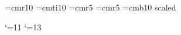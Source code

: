 

\loadeufm

\font\dotless=cmr10 %
\font\itdotless=cmti10
\def\itumi{{\"{\itdotless\char'020}}}
\def\itumj{{\"{\itdotless\char'021}}}
\def\umi{{\"{\dotless\char'020}}}
\def\umj{{\"{\dotless\char'021}}}
\font\thinlinefont=cmr5
\font\smaller=cmr5
\font\boldtitlefont=cmb10 scaled

\NoRunningHeads
{}
\loadeusm

\catcode`\@=11
\def\logo@{}
\catcode`\@=13

\def\eps{{\varepsilon}}
\def\WC{{W_{\dbC}}}
\def\XC{{X_{\dbC}}}
\def\YC{{Y_{\dbC}}}

\def\undertext#1{$\underline{\vphantom{y}\hbox{#1}}$}
\def\nspace{\lineskip=1pt\baselineskip=12pt%
     \lineskiplimit=0pt}
\def\dspace{\lineskip=2pt\baselineskip=18pt%
     \lineskiplimit=0pt}

\def\w{{\mathchoice{\,{\scriptstyle\wedge}\,}
  {{\scriptstyle\wedge}}
  {{\scriptscriptstyle\wedge}}{{\scriptscriptstyle\wedge}}}}
\def\Le{{\mathchoice{\,{\scriptstyle\le}\,}
{\,{\scriptstyle\le}\,}
{\,{\scriptscriptstyle\le}\,}{\,{\scriptscriptstyle\le}\,}}}
\def\Ge{{\mathchoice{\,{\scriptstyle\ge}\,}
{\,{\scriptstyle\ge}\,}
{\,{\scriptscriptstyle\ge}\,}{\,{\scriptscriptstyle\ge}\,}}}

\def\red{\text{\rm red}}
\def\Ber{\text{\rm Ber}}
\def\Diff{\text{\rm Diff}}
\def\HOM{\underline{\text{\rm Hom}}}
\def\Hom{\text{\rm Hom}}

\def\fbar{\bar{f}}
\def\zbar{\bar{z}}
\def\Xbar{\bar{X}}
\def\Ybar{\bar{Y}}

